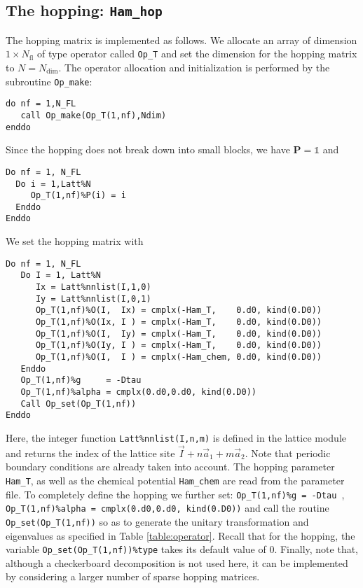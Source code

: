 \subsection{The hopping: \texttt{Ham\_hop}} \label{U_PV_Ham_hop}

The hopping matrix is implemented as follows.
We allocate an array of dimension $1\times N_{\mathrm{fl}}$ of type operator  called \texttt{Op\_T} and set the  dimension for the hopping  matrix to $N=N_{\mathrm{dim}}$. The operator allocation and initialization is performed by the subroutine \texttt{Op\_make}:
\begin{lstlisting}[style=fortran]
do nf = 1,N_FL
   call Op_make(Op_T(1,nf),Ndim)
enddo
\end{lstlisting}
Since the hopping  does not  break down into small blocks, we have ${\bm P}=\mathds{1}$   and  
\begin{lstlisting}[style=fortran]
Do nf = 1, N_FL
  Do i = 1,Latt%N
     Op_T(1,nf)%P(i) = i
  Enddo
Enddo
\end{lstlisting}
We set the hopping matrix  with 
\begin{lstlisting}[style=fortran]
Do nf = 1, N_FL
   Do I = 1, Latt%N
      Ix = Latt%nnlist(I,1,0)
      Iy = Latt%nnlist(I,0,1)
      Op_T(1,nf)%O(I,  Ix) = cmplx(-Ham_T,    0.d0, kind(0.D0))
      Op_T(1,nf)%O(Ix, I ) = cmplx(-Ham_T,    0.d0, kind(0.D0))
      Op_T(1,nf)%O(I,  Iy) = cmplx(-Ham_T,    0.d0, kind(0.D0))
      Op_T(1,nf)%O(Iy, I ) = cmplx(-Ham_T,    0.d0, kind(0.D0))
      Op_T(1,nf)%O(I,  I ) = cmplx(-Ham_chem, 0.d0, kind(0.D0))
   Enddo
   Op_T(1,nf)%g     = -Dtau
   Op_T(1,nf)%alpha = cmplx(0.d0,0.d0, kind(0.D0))
   Call Op_set(Op_T(1,nf))
Enddo
\end{lstlisting}
Here, the integer function \texttt{Latt\%nnlist(I,n,m)} is defined in the lattice module and returns the index of the lattice site $ \vec{I} +  n \vec{a}_1 +  m \vec{a}_2$.
Note that periodic boundary conditions are 
already taken into account.  The hopping parameter \texttt{Ham\_T}, as well as the chemical potential \texttt{Ham\_chem} are read from the parameter file.  
To completely define the hopping  we further set: \texttt{Op\_T(1,nf)\%g = -Dtau }, \texttt{Op\_T(1,nf)\%alpha = cmplx(0.d0,0.d0, kind(0.D0))} and call the routine  \texttt{Op\_set(Op\_T(1,nf))}  so as to generate  the unitary transformation and eigenvalues as specified in Table \ref{table:operator}.  Recall that for the hopping, the variable  \texttt{Op\_set(Op\_T(1,nf))\%type}  takes its default value of 0.  
Finally, note that, although a checkerboard decomposition is not used here, it can be implemented by considering a larger number of sparse hopping matrices.  


